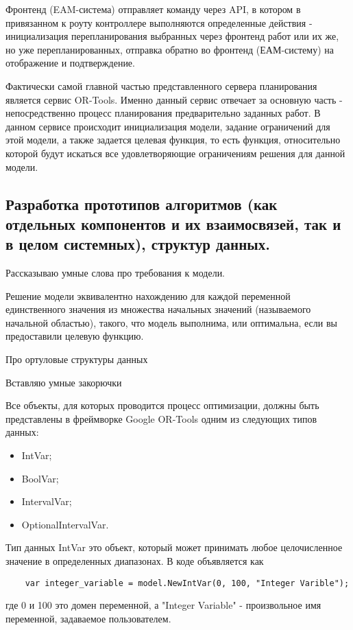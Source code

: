 Фронтенд (EAM-система) отправляет команду через API, в котором в привязанном к роуту контроллере выполняются определенные действия - инициализация перепланирования выбранных через фронтенд работ или их же, но уже перепланированных, отправка обратно во фронтенд (ЕАМ-систему) на отображение и подтверждение.

Фактически самой главной частью представленного сервера планирования является сервис OR-Tools. Именно данный сервис отвечает за основную часть - непосредственно процесс планирования предварительно заданных работ. В данном сервисе происходит инициализация модели, задание ограничений для этой модели, а также задается целевая функция, то есть функция, относительно которой будут искаться все удовлетворяющие ограничениям решения для данной модели.


\subsection{Разработка прототипов алгоритмов (как отдельных компонентов и их взаимосвязей, так и в целом системных), структур данных.}

Рассказываю умные слова про требования к модели.

Решение модели эквивалентно нахождению для каждой переменной единственного значения из множества начальных значений (называемого начальной областью), такого, что модель выполнима, или оптимальна, если вы предоставили целевую функцию.

Про ортуловые структуры данных

Вставляю умные закорючки

Все объекты, для которых проводится процесс оптимизации, должны быть представлены в фреймворке Google OR-Tools одним из следующих типов данных:

\begin{itemize}
	\item IntVar; 
	\item BoolVar;
	\item IntervalVar;
	\item OptionalIntervalVar.
\end{itemize}

Тип данных IntVar это объект, который может принимать любое целочисленное значение в определенных диапазонах. В коде объявляется как
\begin{lstlisting}
	var integer_variable = model.NewIntVar(0, 100, "Integer Varible");
\end{lstlisting}
где 0 и 100 это домен переменной, а "Integer Variable" - произвольное имя переменной, задаваемое пользователем.

